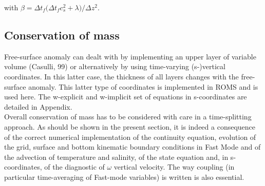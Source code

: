 \documentclass[a4paper,11pt]{article}
\begin{document}
  with $\beta=\Delta{t_f}\big(\Delta{t_f}c_s^2+\lambda\big)/\Delta z^2$.
    

  \subsection{Conservation of mass}
  \label{Subsec_mass}
  Free-surface anomaly can dealt with by implementing an upper layer of variable volume (Casulli, 99) or alternatively by using time-varying (s-)vertical coordinates. In this latter case, the thickness of all layers changes with the free-surface anomaly. This latter type of coordinates is implemented in ROMS and is used here. The w-explicit and w-implicit set of equations in s-coordinates are detailed in Appendix.\\
  
  Overall conservation of mass has to be considered with care in a time-splitting approach. As should be shown in the present section, it is indeed a consequence of the correct numerical implementation of the continuity equation, evolution of the grid, surface and bottom kinematic boundary conditions in Fast Mode and of the advection of temperature and salinity, of the state equation and, in s-coordinates, of the diagnostic of $\omega$ vertical velocity. The way coupling (in particular time-averaging of Fast-mode variables) is written is also essential.\\
  
\end{document}
